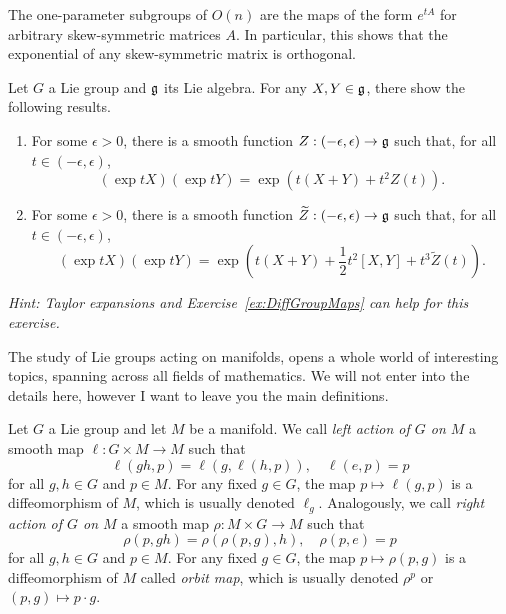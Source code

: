 \begin{exercise}
	The one-parameter subgroups of $O(n)$ are the maps of the form $e^{tA}$ for arbitrary skew-symmetric matrices $A$.
	In particular, this shows that the exponential of any skew-symmetric matrix is orthogonal.
\end{exercise}

\begin{exercise}
	Let $G$ a Lie group and $\mathfrak{g}$ its Lie algebra.
	For any $X,Y\in\mathfrak{g}$, there show the following results.
	\begin{enumerate}
		\item For some $\epsilon>0$, there is a smooth function $Z:(-\epsilon, \epsilon)\to \mathfrak{g}$  such that, for all $t\in(-\epsilon, \epsilon)$,
		      \begin{equation}
			      (\exp tX)(\exp tY) = \exp(t (X+Y) + t^2 Z(t)).
		      \end{equation}
		\item For some $\epsilon>0$, there is a smooth function $\widetilde Z:(-\epsilon, \epsilon)\to \mathfrak{g}$ such that, for all $t\in(-\epsilon, \epsilon)$,
		      \begin{equation}
			      (\exp tX)(\exp tY) = \exp\left(t (X+Y) + \frac12 t^2 [X,Y] + t^3 \widetilde Z(t)\right).
		      \end{equation}
	\end{enumerate}
	\textit{\small Hint: Taylor expansions and Exercise~\ref{ex:DiffGroupMaps} can help for this exercise.}
\end{exercise}

The study of Lie groups acting on manifolds, opens a whole world of interesting topics, spanning across all fields of mathematics.
We will not enter into the details here, however I want to leave you the main definitions.

\begin{definition}
	Let $G$ a Lie group and let $M$ be a manifold.
	We call \emph{left action of $G$ on $M$} a smooth map $\ell: G\times M \to M$ such that
	\begin{equation}
		\ell(gh, p) = \ell(g,\ell(h,p)), \quad \ell(e, p) = p
	\end{equation}
	for all $g,h\in G$ and $p\in M$.
	For any fixed $g\in G$, the map $p\mapsto \ell(g,p)$ is a diffeomorphism of $M$, which is usually denoted $\ell_g$.
	Analogously, we call \emph{right action of $G$ on $M$} a smooth map $\rho: M\times G \to M$ such that
	\begin{equation}
		\rho(p, gh) = \rho(\rho(p,g), h), \quad \rho(p, e) = p
	\end{equation}
	for all $g,h\in G$ and $p\in M$.
	For any fixed $g\in G$, the map $p\mapsto \rho(p,g)$ is a diffeomorphism of $M$ called \emph{orbit map}, which is usually denoted $\rho^p$ or $(p,g)\mapsto p\cdot g$.
\end{definition}

